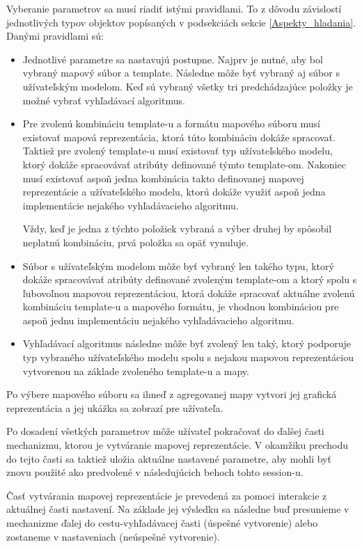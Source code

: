 Vyberanie parametrov sa musí riadiť istými pravidlami. To z dôvodu závislostí jednotlivých typov objektov popísaných v podsekciách sekcie \ref{Aspekty_hladania}. Danými pravidlami sú:
\begin{itemize}
    \item Jednotlivé parametre sa nastavujú postupne. Najprv je nutné, aby bol vybraný mapový súbor a template. Následne môže byť vybraný aj súbor s užívateľským modelom. Keď sú vybraný všetky tri predchádzajúce položky je možné vybrať vyhľadávací algoritmus. 
    \item Pre zvolenú kombináciu template-u a formátu mapového súboru musí existovať mapová reprezentácia, ktorá túto kombináciu dokáže spracovať. Taktiež pre zvolený template-u musí existovať typ užívateľského modelu, ktorý dokáže spracovávať atribúty definované týmto template-om. Nakoniec musí existovať aspoň jedna kombinácia takto definovanej mapovej reprezentácie a užívateľského modelu, ktorú dokáže využiť aspoň jedna implementácie nejakého vyhľadávacieho algoritmu.   
    
    Vždy, keď je jedna z týchto položiek vybraná a výber druhej by spôsobil neplatnú kombináciu, prvá položka sa opäť vynuluje.
    \item Súbor s užívateľským modelom môže byť vybraný len takého typu, ktorý dokáže spracovávať atribúty definované zvoleným template-om a ktorý spolu s ľubovoľnou mapovou reprezentáciou, ktorá dokáže spracovať aktuálne zvolenú kombináciu template-u a mapového formátu, je vhodnou kombináciou pre aspoň jednu implementáciu nejakého vyhľadávacieho algoritmu. 
    \item Vyhľadávací algoritmus následne môže byť zvolený len taký, ktorý podporuje typ vybraného užívateľského modelu spolu s nejakou mapovou reprezentáciou vytvorenou na základe zvoleného template-u a mapy. 
\end{itemize}    

Po výbere mapového súboru sa ihneď z agregovanej mapy vytvori jej grafická reprezentácia a jej ukážka sa zobrazí pre užívateľa.

Po dosadení všetkých parametrov môže užívateľ pokračovať do ďalšej časti mechanizmu, ktorou je vytváranie mapovej reprezentácie. V okamžiku prechodu do tejto časti sa taktiež uložia aktuálne nastavené parametre, aby mohli byť znovu použité ako predvolené v následujúcich behoch tohto session-u. 

Časť vytvárania mapovej reprezentácie je prevedená za pomoci interakcie z aktuálnej časti nastavení. Na základe jej výsledku sa následne buď presunieme v mechanizme ďalej do cestu-vyhľadávacej časti (úspešné vytvorenie) alebo zostaneme v nastaveniach (neúspešné vytvorenie).  

